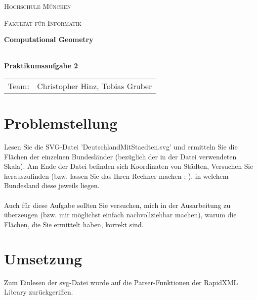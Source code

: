 \documentclass[12pt]{scrartcl}
\begin{document}
\begin{titlepage}
    \vfill
	\centering
	{\scshape\LARGE Hochschule München \par}
    {\scshape\Large Fakultät für Informatik \par}
	\vspace{1.5cm}




    \vfill
	{\LARGE\bfseries Computational Geometry\\~\\ \par}
	{\LARGE\bfseries Praktikumsaufgabe 2\par}
	\vfill
    \vfill


    \begin{tabular}{ll}
    \normalsize
    Team:  & Christopher Hinz, Tobias Gruber\\
    \end{tabular}

	\vfill

\end{titlepage}

\newpage



\raggedright

\section{Problemstellung}
Lesen Sie die SVG-Datei 'DeutschlandMitStaedten.svg' und ermitteln Sie die Flächen der einzelnen Bundesländer (bezüglich der in der Datei verwendeten Skala).
Am Ende der Datei befinden sich Koordinaten von Städten, Versuchen Sie herauszufinden (bzw. lassen Sie das Ihren Rechner machen ;-), in welchem Bundesland diese jeweils liegen.\\~\\
Auch für diese Aufgabe sollten Sie versuchen, mich in der Ausarbeitung zu überzeugen (bzw. mir möglichst einfach nachvollziehbar machen), warum die Flächen, die Sie ermittelt haben, korrekt sind.


\section{Umsetzung}

Zum Einlesen der svg-Datei wurde auf die Parser-Funktionen der RapidXML Library zurückgeriffen.
\end{document}
